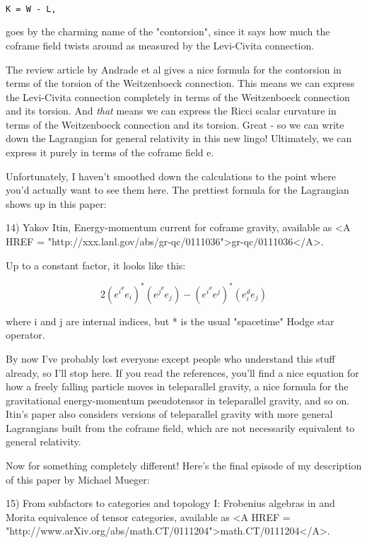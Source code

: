 \begin{verbatim}

K = W - L,
\end{verbatim}
    
goes by the charming name of the "contorsion", since it says how
much the coframe field twists around as measured by the Levi-Civita
connection.

The review article by Andrade et al gives a nice formula for the
contorsion in terms of the torsion of the Weitzenboeck connection.  
This means we can express the Levi-Civita connection completely in 
terms of the Weitzenboeck connection and its torsion.  And \emph{that}
means we can express the Ricci scalar curvature in terms of the 
Weitzenboeck connection and its torsion.  Great - so we can write 
down the Lagrangian for general relativity in this new lingo!  
Ultimately, we can express it purely in terms of the coframe field e.  

Unfortunately, I haven't smoothed down the calculations to the point
where you'd actually want to see them here.  The prettiest formula 
for the Lagrangian shows up in this paper:

14) Yakov Itin, Energy-momentum current for coframe gravity, available
as <A HREF = "http://xxx.lanl.gov/abs/gr-qc/0111036">gr-qc/0111036</A>.

Up to a constant factor, it looks like this:


$$

2(e^{i} ^ de_{i}) ^ *(e^{j} ^ de_{j}) - (e^{i} ^ de^{j}) ^ *(e_{i} ^ de_{j}) 
$$
    

where i and j are internal indices, but * is the usual "spacetime" Hodge
star operator.

By now I've probably lost everyone except people who understand this
stuff already, so I'll stop here.  If you read the references, you'll
find a nice equation for how a freely falling particle moves in 
teleparallel gravity, a nice formula for the gravitational
energy-momentum pseudotensor in teleparallel gravity, and so on.  
Itin's paper also considers versions of teleparallel gravity with
more general Lagrangians built from the coframe field, which are not
necessarily equivalent to general relativity.

Now for something completely different!  Here's the final episode of my
description of this paper by Michael Mueger:

15) From subfactors to categories and topology I: Frobenius algebras in
and Morita equivalence of tensor categories, available as
<A HREF = "http://www.arXiv.org/abs/math.CT/0111204">math.CT/0111204</A>.

